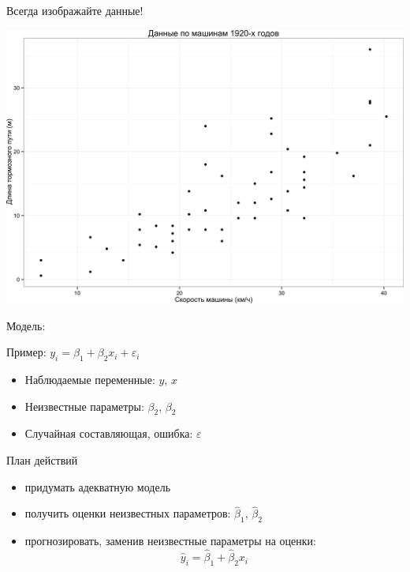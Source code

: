 \documentclass[ignorenonframetext,]{beamer}
\begin{document}
\begin{frame}{Всегда изображайте данные!}

\includegraphics{lec_01_files/figure-beamer/unnamed-chunk-3-1.png}

\end{frame}

\begin{frame}{Модель:}

Пример: \(y_i=\beta_1 + \beta_2 x_i + \varepsilon_i\)

\begin{itemize}
\itemsep1pt\parskip0pt
\item
  Наблюдаемые переменные: \(y\), \(x\)
\item
  Неизвестные параметры: \(\beta_2\), \(\beta_2\)
\item
  Случайная составляющая, ошибка: \(\varepsilon\)
\end{itemize}

\begin{block}{План действий}

\begin{itemize}
\itemsep1pt\parskip0pt
\item
  придумать адекватную модель\\
\item
  получить оценки неизвестных параметров: \(\hat{\beta}_1\),
  \(\hat{\beta}_2\)\\
\item
  прогнозировать, заменив неизвестные параметры на оценки:\\\[
  \hat{y}_i=\hat{\beta}_1 + \hat{\beta}_2 x_i
  \]
\end{itemize}

\end{block}

\end{frame}
\end{document}
